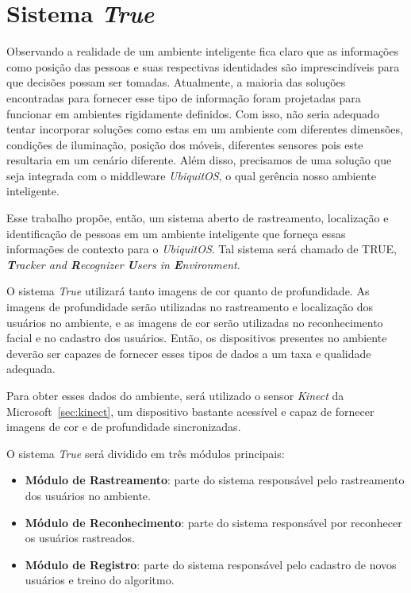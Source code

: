 \chapter{Sistema \textit{True}}

Observando a realidade de um ambiente inteligente fica claro que as informações como posição das pessoas e suas respectivas identidades são imprescindíveis para que decisões possam ser tomadas. Atualmente, a maioria das soluções encontradas para fornecer esse tipo de informação foram projetadas para funcionar em ambientes rigidamente definidos. Com isso, não seria adequado tentar incorporar soluções como estas em um ambiente com diferentes dimensões, condições de iluminação, posição dos móveis, diferentes sensores pois este resultaria em um cenário diferente. Além disso, precisamos de uma solução que seja integrada com o middleware \textit{UbiquitOS}, o qual gerência nosso ambiente inteligente.

Esse trabalho propõe, então, um sistema aberto de rastreamento, localização e identificação de pessoas em um ambiente inteligente que forneça essas informações de contexto para o \textit{UbiquitOS}. Tal sistema será chamado de TRUE, \textit{\textbf{T}racker and \textbf{R}ecognizer \textbf{U}sers in \textbf{E}nvironment}.

O sistema \textit{True} utilizará tanto imagens de cor quanto de profundidade. As imagens de profundidade serão utilizadas no rastreamento e localização dos usuários no ambiente, e as imagens de cor serão utilizadas no reconhecimento facial e no cadastro dos usuários. Então, os dispositivos presentes no ambiente deverão ser capazes de fornecer esses tipos de dados a um taxa e qualidade adequada. 

Para obter esses dados do ambiente, será utilizado o sensor \textit{Kinect} da Microsoft~\ref{sec:kinect}, um dispositivo bastante acessível e capaz de fornecer imagens de cor e de profundidade sincronizadas.

O sistema \textit{True} será dividido em três módulos principais:

	\begin{itemize}
		\item \textbf{Módulo de Rastreamento}: parte do sistema responsável pelo rastreamento dos usuários no ambiente.
		\item \textbf{Módulo de Reconhecimento}: parte do sistema responsável por reconhecer os usuários rastreados.
		\item \textbf{Módulo de Registro}: parte do sistema responsável pelo cadastro de novos usuários e treino do algoritmo.
	\end{itemize}

